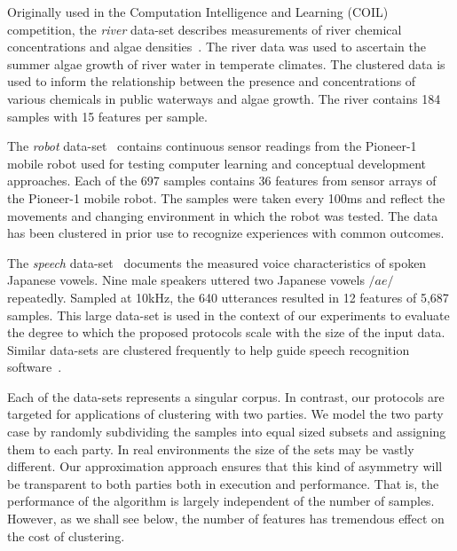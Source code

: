 Originally used in the Computation Intelligence and Learning
(COIL) competition, the {\it river} data-set describes 
measurements of river chemical concentrations and algae
densities~\cite{coil99}.  The river data was used to ascertain the
summer algae growth of river water in temperate climates.  The
clustered data is used to inform the relationship between the presence
and concentrations of various chemicals in public waterways and algae
growth.  The river contains 184 samples with 15 features per sample.

The {\it robot} data-set~\cite{pion98} contains continuous sensor
readings from the Pioneer-1 mobile robot used for testing computer
learning and conceptual development approaches.  Each of the 697
samples contains 36 features from sensor arrays of the Pioneer-1
mobile robot.  The samples were taken every 100ms and reflect the
movements and changing environment in which the robot was tested.  The
data has been clustered in prior use to recognize experiences with
common outcomes.

The {\it speech} data-set~\cite{jvow00} documents the measured voice
characteristics of spoken Japanese vowels.  Nine male speakers uttered
two Japanese vowels $/ae/$ repeatedly.  Sampled at 10kHz, the 640
utterances resulted in 12 features of 5,687 samples.  This large
data-set is used in the context of our experiments to evaluate the
degree to which the proposed protocols scale with the size of the
input data.  Similar data-sets are clustered frequently to help guide
speech recognition software~\cite{kts99}.

Each of the data-sets represents a singular corpus.  In contrast, our
protocols are targeted for applications of clustering with two
parties.  We model the two party case by randomly subdividing the
samples into equal sized subsets and assigning them to each party.  In
real environments the size of the sets may be vastly different.
Our approximation approach ensures that this kind of asymmetry will be
transparent to both parties both in execution and performance.  That
is, the performance of the algorithm is largely independent of the
number of samples.  However, as we shall see below, the number
of features has tremendous effect on the cost of clustering.

